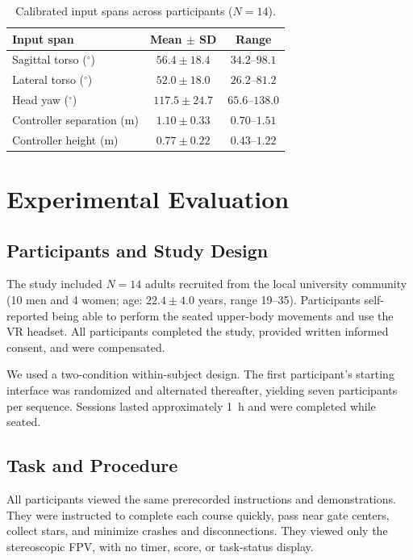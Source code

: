 \documentclass[a4paper,10pt,conference]{ieeeconf}
\begin{document}

\begin{table}[t]
\centering
\caption{Calibrated input spans across participants ($N=14$).}
\label{tab:calibration_summary}
\footnotesize
\setlength{\tabcolsep}{3.5pt}
\begin{tabular}{@{}lcc@{}}
\toprule
Input span & Mean $\pm$ SD & Range \\
\midrule
Sagittal torso ($^\circ$)       & $56.4 \pm 18.4$  & $34.2$--$98.1$ \\
Lateral torso ($^\circ$)        & $52.0 \pm 18.0$  & $26.2$--$81.2$ \\
Head yaw ($^\circ$)             & $117.5 \pm 24.7$ & $65.6$--$138.0$ \\
Controller separation (m)       & $1.10 \pm 0.33$  & $0.70$--$1.51$ \\
Controller height (m)           & $0.77 \pm 0.22$  & $0.43$--$1.22$ \\
\bottomrule
\end{tabular}
\end{table}

\section{Experimental Evaluation}
\label{sec:experiment}

\subsection{Participants and Study Design}
\label{sec:participants_design}

The study included $N=14$ adults recruited from the local university
community (10 men and 4 women; age: $22.4 \pm 4.0$ years, range 19--35).
Participants self-reported being able to perform the seated upper-body
movements and use the VR headset. All
participants completed the study, provided written informed consent, and were
compensated.

We used a two-condition within-subject design. The first participant's starting
interface was randomized and alternated thereafter, yielding seven participants
per sequence. Sessions lasted approximately 1~h and were completed while
seated.

\subsection{Task and Procedure}
\label{sec:task}
All participants viewed the same prerecorded instructions and demonstrations.
They were instructed to complete each course quickly, pass near gate centers,
collect stars, and minimize crashes and disconnections. They viewed only the
stereoscopic FPV, with no timer, score, or task-status display.
\end{document}
